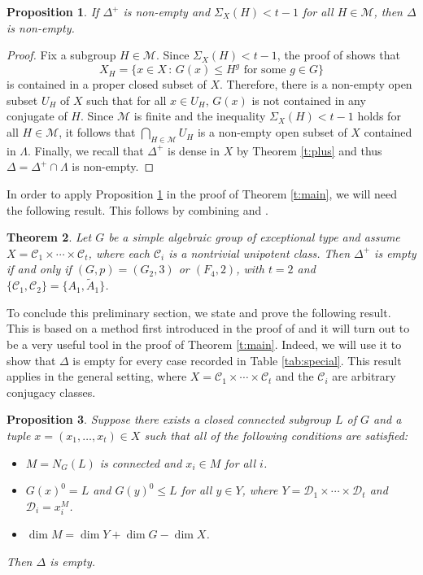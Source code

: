 \documentclass[twoside,a4paper,reqno,11pt]{amsart}
\newcommand{\<}{\langle}
\renewcommand{\>}{\rangle}
\newcommand{\leqs}{\leqslant}
\renewcommand{\:}{\colon}
\theoremstyle{plain}
\newtheorem{thm}{Theorem}[section]
\newtheorem{prop}[thm]{Proposition}
\theoremstyle{definition}
\begin{document}
\begin{prop}\label{p:fix}
If $\Delta^+$ is non-empty and $\Sigma_X(H)<t-1$ for all $H \in \mathcal{M}$, then $\Delta$ is non-empty.
\end{prop}

\begin{proof}
Fix a subgroup $H \in \mathcal{M}$. Since $\Sigma_X(H)<t-1$, the proof of \cite[Theorem 5]{BGG1} shows that
\[
X_H = \{ x \in X \,:\, \mbox{$G(x) \leqs H^g$ for some $g \in G$}\}
\]
is contained in a proper closed subset of $X$. Therefore, there is a non-empty open subset $U_H$ of $X$ such that for all $x \in U_H$, $G(x)$ is not contained in any conjugate of $H$. Since $\mathcal{M}$ is finite and the inequality $\Sigma_X(H)<t-1$ holds for all $H \in \mathcal{M}$, it follows that 
$\bigcap_{H \in \mathcal{M}} U_H$ is a non-empty open subset of $X$ contained in $\Lambda$. Finally, we recall that $\Delta^+$ is dense in $X$ by Theorem \ref{t:plus} and thus $\Delta = \Delta^+ \cap \Lambda$ is non-empty.
\end{proof}

In order to apply Proposition \ref{p:fix} in the proof of Theorem \ref{t:main}, we will need the following result. This follows by combining  \cite[Corollary 4]{BGG1} and \cite[Theorem 1.1]{GMT}.

\begin{thm}\label{t:plus2}
Let $G$ be a simple algebraic group of exceptional type and assume $X = \mathcal{C}_1 \times \cdots \times \mathcal{C}_t$, where each $\mathcal{C}_i$ is a nontrivial unipotent class. Then $\Delta^+$ is empty if and only if $(G,p) = (G_2,3)$ or $(F_4,2)$, with $t=2$ and $\{\mathcal{C}_1,\mathcal{C}_2\} = \{A_1,\tilde{A}_1\}$.
\end{thm}

To conclude this preliminary section, we state and prove the following result. This is based on a method first introduced in the proof of \cite[Lemma 4.1]{BGG2} and it will turn out to be a very useful tool in the proof of Theorem \ref{t:main}. Indeed, we will use it to show that $\Delta$ is empty for every case recorded in Table \ref{tab:special}. This result applies in the general setting, where $X = \mathcal{C}_1 \times \cdots \times \mathcal{C}_t$ and the $\mathcal{C}_i$ are arbitrary conjugacy classes.

\begin{prop}\label{p:fibre}
Suppose there exists a closed connected subgroup $L$ of $G$ and a tuple $x = (x_1, \ldots, x_t) \in X$ such that all of the following conditions are satisfied:
\begin{itemize}\addtolength{\itemsep}{0.2\baselineskip}
\item[{\rm (i)}] $M = N_G(L)$ is connected and $x_i \in M$ for all $i$.
\item[{\rm (ii)}] $G(x)^0 = L$ and $G(y)^0 \leqs L$ for all $y \in Y$, where $Y = \mathcal{D}_1 \times \cdots \times \mathcal{D}_t$ and $\mathcal{D}_i = x_i^M$.
\item[{\rm (iii)}] $\dim M = \dim Y + \dim G - \dim X$.
\end{itemize}
Then $\Delta$ is empty.
\end{prop}
\end{document}

